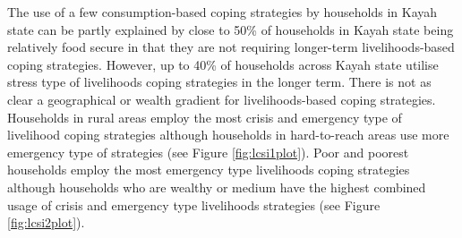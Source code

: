 \documentclass[12pt,a4paper]{article}
\begin{document}
The use of a few consumption-based coping strategies by households in Kayah state can be partly explained by close to 50\% of households in Kayah state being relatively food secure in that they are not requiring longer-term livelihoods-based coping strategies. However, up to 40\% of households across Kayah state utilise stress type of livelihoods coping strategies in the longer term. There is not as clear a geographical or wealth gradient for livelihoods-based coping strategies. Households in rural areas employ the most crisis and emergency type of livelihood coping strategies although households in hard-to-reach areas use more emergency type of strategies (see Figure \ref{fig:lcsi1plot}). Poor and poorest households employ the most emergency type livelihoods coping strategies although households who are wealthy or medium have the highest combined usage of crisis and emergency type livelihoods strategies (see Figure \ref{fig:lcsi2plot}).
\end{document}
